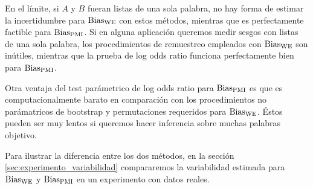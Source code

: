 En el límite, si $A$ y $B$ fueran listas de una sola palabra, no hay forma de estimar la incertidumbre para $\operatorname{Bias_{WE}}$ con estos métodos, mientras que es perfectamente factible para $\operatorname{Bias_{PMI}}$. Si en alguna aplicación queremos medir sesgos con listas de una sola palabra, los procedimientos de remuestreo empleados con $\operatorname{Bias_{WE}}$ son inútiles, mientras que la prueba de log odds ratio funciona perfectamente bien para $\operatorname{Bias_{PMI}}$.

Otra ventaja del test parámetrico de log odds ratio para $\operatorname{Bias_{PMI}}$ es que es computacionalmente barato en comparación con los procedimientos no parámatricos de bootstrap y permutaciones requeridos para $\operatorname{Bias_{WE}}$. Éstos pueden ser muy lentos si queremos hacer inferencia sobre muchas palabras objetivo.

Para ilustrar la diferencia entre los dos métodos, en la sección \ref{sec:experimento_variabilidad} compararemos la variabilidad estimada para $\operatorname{Bias_{WE}}$ y $\operatorname{Bias_{PMI}}$ en un experimento con datos reales.
